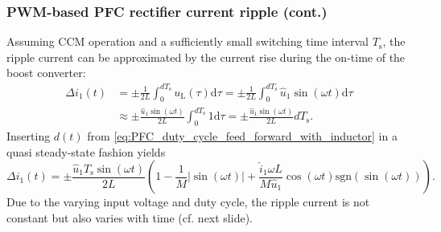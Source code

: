 \begin{frame}
    \frametitle{PWM-based PFC rectifier current ripple (cont.)} 
    Assuming CCM operation and a sufficiently small switching time interval $T_\mathrm{s}$, the ripple current can be approximated by the current rise during the on-time of the boost converter:
    \begin{equation}
        \begin{split}
            \Delta i_1(t) &=  \pm\frac{1}{2L}\int_{0}^{d T_\mathrm{s}} u_\mathrm{L}(\tau) \mathrm{d}\tau= \pm \frac{1}{2L}\int_{0}^{d T_\mathrm{s}} \hat{u}_1 \sin(\omega t) \mathrm{d}\tau\\
            &\approx \pm \frac{\hat{u}_1 \sin(\omega t)}{2L}\int_{0}^{d T_\mathrm{s}} 1 \mathrm{d}\tau = \pm \frac{\hat{u}_1 \sin(\omega t)}{2L}d T_\mathrm{s}.
        \end{split}
    \end{equation}
    Inserting $d(t)$ from \eqref{eq:PFC_duty_cycle_feed_forward_with_inductor} in a quasi steady-state fashion yields
    \begin{equation}
        \Delta i_1(t) = \pm \frac{\hat{u}_1 T_\mathrm{s} \sin(\omega t)}{2L}\left(1 - \frac{1}{M}|\sin(\omega t)| + \frac{\hat{i}_1\omega L}{M\hat{u}_1} \cos(\omega t) \mathrm{sgn}(\sin(\omega t))\right).
    \end{equation}
    Due to the varying input voltage and duty cycle, the ripple current is not constant but also varies with time (cf. next slide). 
\end{frame}

